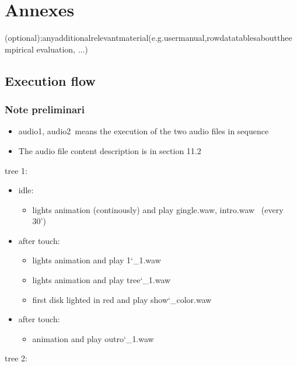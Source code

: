 \documentclass[a4paper,11pt]{report}
\begin{document}




\chapter{Annexes}
(optional):anyadditionalrelevantmaterial(e.g.usermanual,rowdatatablesabouttheempirical evaluation, ...)
\section{Execution flow}
\subsection{Note preliminari}
\begin{itemize}
	\item \lbrack audio1, audio2\rbrack ~means the execution of the two audio files in sequence
	\item The audio file content description is in section 11.2
\end{itemize}
tree 1:
\begin{itemize}
	\item idle:
	\begin{itemize}
		\item lights animation (continously) and play \lbrack gingle.waw, intro.waw\rbrack~ (every 30')
	\end{itemize}
	\item after touch:
	\begin{itemize}
		\item lights animation and play 1\char`_1.waw 
		\item lights animation and play tree\char`_1.waw
		\item first disk lighted in red and play show\char`_color.waw
	\end{itemize}
	\item after touch:
	\begin{itemize}
		\item animation and play outro\char`_1.waw
	\end{itemize}
\end{itemize}
tree 2:
\end{document}
